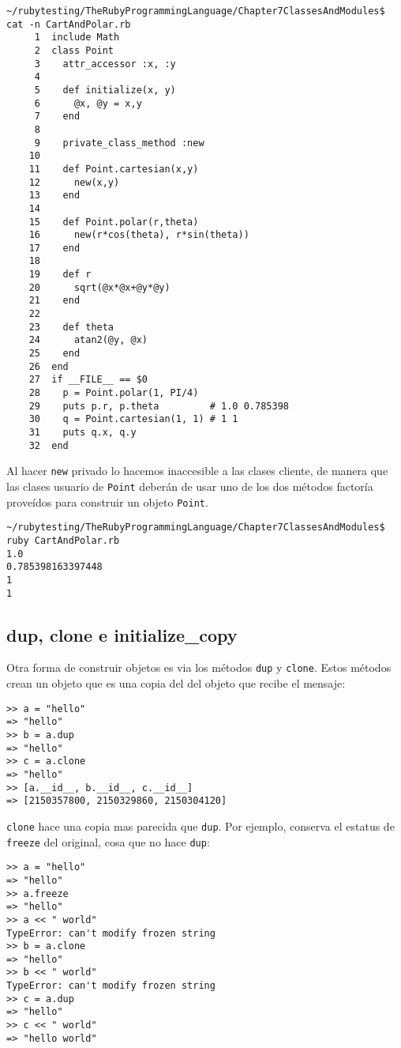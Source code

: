 \begin{verbatim}
~/rubytesting/TheRubyProgrammingLanguage/Chapter7ClassesAndModules$ cat -n CartAndPolar.rb 
     1  include Math
     2  class Point
     3    attr_accessor :x, :y
     4  
     5    def initialize(x, y)
     6      @x, @y = x,y
     7    end
     8  
     9    private_class_method :new
    10  
    11    def Point.cartesian(x,y)
    12      new(x,y)
    13    end
    14  
    15    def Point.polar(r,theta)
    16      new(r*cos(theta), r*sin(theta))
    17    end
    18  
    19    def r 
    20      sqrt(@x*@x+@y*@y)
    21    end
    22  
    23    def theta
    24      atan2(@y, @x)
    25    end
    26  end
    27  if __FILE__ == $0 
    28    p = Point.polar(1, PI/4)
    29    puts p.r, p.theta         # 1.0 0.785398
    30    q = Point.cartesian(1, 1) # 1 1
    31    puts q.x, q.y
    32  end
\end{verbatim}
Al hacer \verb|new| privado lo hacemos inaccesible a las clases cliente,
de manera que las clases usuario de \verb|Point| deberán de usar uno de los dos métodos factoría proveídos para construir un objeto \verb|Point|.

\begin{verbatim}
~/rubytesting/TheRubyProgrammingLanguage/Chapter7ClassesAndModules$ ruby CartAndPolar.rb 
1.0
0.785398163397448
1
1
\end{verbatim}

\subsection{dup, clone e initialize\_copy}

Otra forma de construir objetos es via los métodos
\verb|dup| y \verb|clone|. 
Estos métodos crean un objeto que es una copia del del objeto que recibe el mensaje:
\begin{verbatim}
>> a = "hello"
=> "hello"
>> b = a.dup
=> "hello"
>> c = a.clone
=> "hello"
>> [a.__id__, b.__id__, c.__id__]
=> [2150357800, 2150329860, 2150304120]
\end{verbatim}

\verb|clone| hace una copia mas parecida que \verb|dup|. Por ejemplo,
conserva el estatus de \verb|freeze| del original, cosa que no hace \verb|dup|:

\begin{verbatim}
>> a = "hello"
=> "hello"
>> a.freeze
=> "hello"
>> a << " world"
TypeError: can't modify frozen string
>> b = a.clone
=> "hello"
>> b << " world"
TypeError: can't modify frozen string
>> c = a.dup
=> "hello"
>> c << " world"
=> "hello world"
\end{verbatim}

